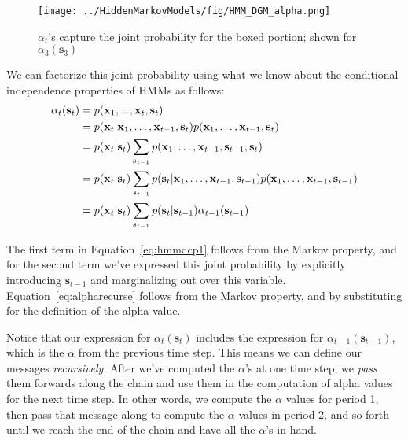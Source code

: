 \begin{figure}[h!]
    \centering
    \texttt{[image: ../HiddenMarkovModels/fig/HMM\_DGM\_alpha.png]}
    \caption{$\alpha_t$'s capture the joint probability for the boxed portion; shown for $\alpha_3(\mathbf{s}_3)$}
    \label{fig:HMM-DGM-alpha}
\end{figure}




We can factorize this joint probability using what we know about the conditional independence properties of HMMs as follows:
%
\begin{align} 
  \alpha_t(\textbf{s}_t) &= p(\textbf{x}_1, ..., \textbf{x}_t, \textbf{s}_t) \notag \\
                         &=p(\textbf{x}_t|\textbf{x}_1,\ldots,\textbf{x}_{t-1},\textbf{s}_t)p(\textbf{x}_1,\ldots,\textbf{x}_{t-1},\textbf{s}_t)\notag \\
                         &=p(\textbf{x}_t|\textbf{s}_t)\sum_{s_{t-1}}p(\textbf{x}_1,\ldots,\textbf{x}_{t-1},\textbf{s}_{t-1},\textbf{s}_t) \label{eq:hmmdcp1} \\
                         &=p(\textbf{x}_t|\textbf{s}_t)\sum_{s_{t-1}}p(\textbf{s}_t|\textbf{x}_1,\ldots,\textbf{x}_{t-1},\textbf{s}_{t-1})p(\textbf{x}_1,\ldots,\textbf{x}_{t-1},\textbf{s}_{t-1})\\
  &= p(\textbf{x}_t | \textbf{s}_t) \sum_{s_{t-1}} p(\textbf{s}_t | \textbf{s}_{t-1}) \alpha_{t-1}(\textbf{s}_{t-1})\label{eq:alpharecurse}
\end{align}

The first term in Equation~\eqref{eq:hmmdcp1} follows from the Markov property, and for the second term we've expressed this joint probability by explicitly introducing $\textbf{s}_{t-1}$ and marginalizing out over this variable. Equation~\ref{eq:alpharecurse} follows from the Markov property, and by
substituting for the definition of the alpha value. 



Notice that our expression for $\alpha_t(\textbf{s}_t)$ includes the expression for $\alpha_{t-1}(\textbf{s}_{t-1})$, which is the $\alpha$ from the previous time step.
This means we can define our messages \textit{recursively}.
%
After we've computed the $\alpha$'s at one time step,
we \textit{pass} them forwards along the chain and use them in the computation of
alpha values for the next time step.
%
In other words, we compute the $\alpha$ values for period 1, then pass that message along to compute the $\alpha$ values  in period 2, and so forth until we reach the end of the chain and have all the $\alpha$'s in hand.

